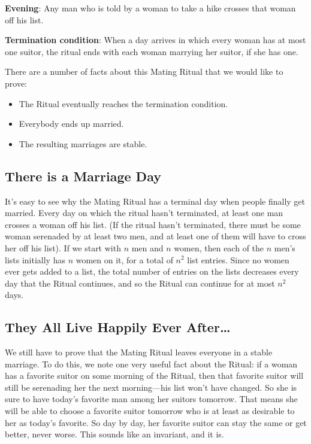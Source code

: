 \textbf{Evening}: Any man who is told by a woman to take a hike
crosses that woman off his list.

\textbf{Termination condition}: When a day arrives in which every
woman has at most one suitor, the ritual ends with each woman marrying
her suitor, if she has one.


There are a number of facts about this Mating Ritual that we would like to
prove:

\begin{itemize}
\item The Ritual eventually reaches the termination condition.
\item Everybody ends up married.
\item The resulting marriages are stable.
\end{itemize}


\subsection{There is a Marriage Day}

It's easy to see why the Mating Ritual has a terminal day when people
finally get married.  Every day on which the ritual hasn't terminated, at
least one man crosses a woman off his list.  (If the ritual hasn't
terminated, there must be some woman serenaded by at least two men, and at
least one of them will have to cross her off his list).  If we start with
$n$ men and $n$ women, then each of the $n$ men's lists initially has $n$
women on it, for a total of $n^2$ list entries.  Since no women ever gets
added to a list, the total number of entries on the lists decreases every
day that the Ritual continues, and so the Ritual can continue for at most
$n^2$ days.

\subsection{They All Live Happily Ever After\dots}

We still have to prove that the Mating Ritual leaves everyone in a
stable marriage.  To do this, we note one very useful fact about the
Ritual: if a woman has a favorite suitor on some morning of the
Ritual, then that favorite suitor will still be serenading her the
next morning---his list won't have changed.  So she is sure to
have today's favorite man among her suitors tomorrow.  That means she
will be able to choose a favorite suitor tomorrow who is at least as
desirable to her as today's favorite.  So day by day, her favorite
suitor can stay the same or get better, never worse.  This sounds like
an invariant, and it is.


